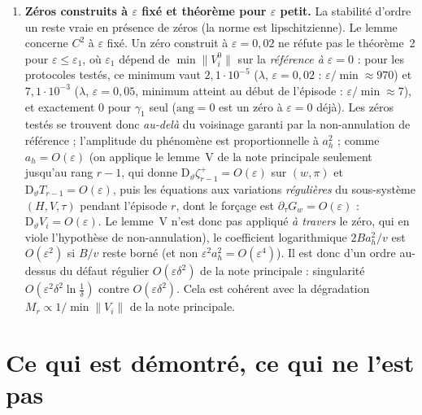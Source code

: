 \documentclass[11pt,a4paper]{article}
\theoremstyle{remark}
\newcommand{\eps}{\varepsilon}
\newcommand{\vth}{\vartheta}
\newcommand{\D}{\mathrm D}
\begin{document}
\begin{enumerate}[nosep,label=(\roman*)]
\item \textbf{Zéros construits à $\eps$ fixé et théorème pour $\eps$ petit.} La stabilité d'ordre un reste vraie en présence de zéros (la norme est lipschitzienne). Le lemme concerne $C^2$ à $\eps$ fixé. Un zéro construit à $\eps=0{,}02$ ne réfute pas le théorème~2 pour $\eps\le\eps_1$, où $\eps_1$ dépend de $\min\lVert V_i^0\rVert$ sur la \emph{référence à $\eps=0$} : pour les protocoles testés, ce minimum vaut $2{,}1\cdot10^{-5}$ ($\lambda$, $\eps=0{,}02$ : $\eps/\min\approx970$) et $7{,}1\cdot10^{-3}$ ($\lambda$, $\eps=0{,}05$, minimum atteint au début de l'épisode : $\eps/\min\approx7$), et exactement $0$ pour $\gamma_1$ seul ($\mathrm{ang}=0$ est un zéro à $\eps=0$ déjà). Les zéros testés se trouvent donc \emph{au-delà} du voisinage garanti par la non-annulation de référence ; l'amplitude du phénomène est proportionnelle à $a_h^2$ ; comme $a_h=O(\eps)$ (on applique le lemme~V de la note principale seulement jusqu'au rang $r-1$, qui donne $\D_\vth\zeta^+_{r-1}=O(\eps)$ sur $(w,\pi)$ et $\D_\vth T_{r-1}=O(\eps)$, puis les équations aux variations \emph{régulières} du sous-système $(H,V,\tau)$ pendant l'épisode $r$, dont le forçage est $\partial_\tau G_w=O(\eps)$ : $\D_\vth V_i=O(\eps)$. Le lemme~V n'est donc pas appliqué \emph{à travers} le zéro, qui en viole l'hypothèse de non-annulation), le coefficient logarithmique $2Ba_h^2/v$ est $O(\eps^2)$ si $B/v$ reste borné (et non $\eps^2a_h^2=O(\eps^4)$). Il est donc d'un ordre au-dessus du défaut régulier $O(\eps\delta^2)$ de la note principale : singularité $O(\eps^2\delta^2\ln\frac1\delta)$ contre $O(\eps\delta^2)$. Cela est cohérent avec la dégradation $M_r\propto1/\min\lVert V_i\rVert$ de la note principale.
\end{enumerate}

\section{Ce qui est démontré, ce qui ne l'est pas}\label{sec:limites}
\end{document}
